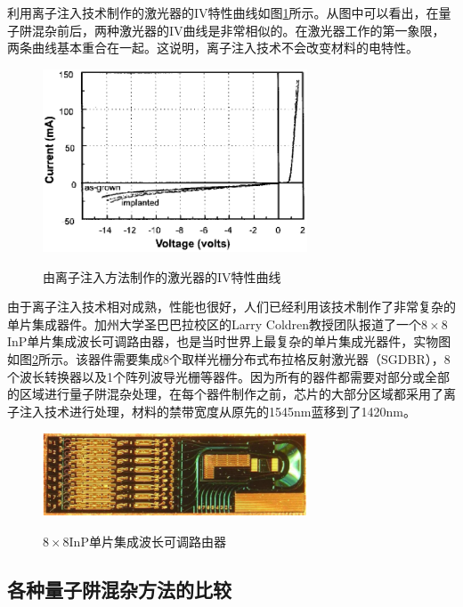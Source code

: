 \documentclass[oneside]{ZJUthesis}
\begin{document}
利用离子注入技术制作的激光器的IV特性曲线如图\ref{fig_implantation_laser}所示。从图中可以看出，在量子阱混杂前后，两种激光器的IV曲线是非常相似的。在激光器工作的第一象限，两条曲线基本重合在一起。这说明，离子注入技术不会改变材料的电特性。

\begin{figure}[!h]
  \centering
  \includegraphics[width=0.7\textwidth]{./Pictures/implantation_laser.eps}\\
  \caption{由离子注入方法制作的激光器的IV特性曲线}
  \label{fig_implantation_laser}
\end{figure}

由于离子注入技术相对成熟，性能也很好，人们已经利用该技术制作了非常复杂的单片集成器件。加州大学圣巴巴拉校区的Larry Coldren教授团队报道了一个$8\times8$InP单片集成波长可调路由器\cite{nicholes20108}，也是当时世界上最复杂的单片集成光器件，实物图如图\ref{fig_motor}所示。该器件需要集成8个取样光栅分布式布拉格反射激光器（SGDBR），8个波长转换器以及1个阵列波导光栅等器件。因为所有的器件都需要对部分或全部的区域进行量子阱混杂处理，在每个器件制作之前，芯片的大部分区域都采用了离子注入技术进行处理，材料的禁带宽度从原先的1545nm蓝移到了1420nm。

\begin{figure}[!h]
  \centering
  \includegraphics[width=0.7\textwidth]{./Pictures/motor.eps}\\
  \caption{$8\times8$InP单片集成波长可调路由器}
  \label{fig_motor}
\end{figure}

\subsection{各种量子阱混杂方法的比较}
\end{document}
